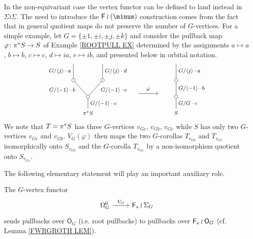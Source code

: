 \documentclass[a4paper,10pt]{article}%
\begin{document}
\begin{remark}\label{NEED_WREATH_REMARK}
In the non-equivariant case the vertex functor can be defined to land instead in $\Sigma \wr \Sigma$.
	The need to introduce the $\Fin \wr (\minus)$ construction comes from the fact that
	in general quotient maps do not preserve the number of $G$-vertices.
	For a simple example, let $G=\{\pm 1, \pm i, \pm j, \pm k\}$ and consider the pullback map 
	$\varphi \colon \pi^{\**} S \to S$ of Example \ref{ROOTPULL EX}
	determined by the assignments
	$a \mapsto a$, $b \mapsto b$, $c \mapsto c$, $d \mapsto i a$, $e \mapsto i b$,	
	and presented below in orbital notation. 
		\[
		\begin{tikzpicture}[grow=up,auto,level distance=2.4em,every node/.style = {font=\footnotesize},dummy/.style={circle,draw,inner sep=0pt,minimum size=1.75mm}]
		\node at (0,0) {$\pi^{\**}S$}
			child{node [dummy] {}
				child{node [dummy] {}
					child{
					edge from parent node [swap] {$G/\langle j \rangle  \cdot d$}}
				edge from parent node[near end,swap] {$G/\langle -1 \rangle  \cdot e$}}
				child{node [dummy] {}
					child{
					edge from parent node {$G/\langle j \rangle  \cdot a$}}
				edge from parent node [near end] {$G/\langle -1 \rangle  \cdot b$}}		
			edge from parent node[swap] {$G/\langle -1 \rangle  \cdot c$}};
		\node at (4.53,0) {$S$}
			child{node [dummy] {}
				child{node [dummy] {}
					child{
					edge from parent node [swap] {$G/\langle j \rangle \cdot a$}}
				edge from parent node [swap] {$G / \langle -1 \rangle \cdot b$}}
			edge from parent node [swap] {$G/G \cdot c$}};
		\draw[->] (2.6,1) -- node [above] {$\varphi$} (3.6,1) ;
		\end{tikzpicture}
		\]
We note that $T = \pi^{\**} S$ has three $G$-vertices $v_{G c}$, $v_{G b}$, $v_{G e}$ while $S$ has only two $G$-vertices $v_{G c}$ and $v_{G b}$. $V_G(\varphi)$ then maps the two $G$-corollas 
$T_{v_{G b}}$ and $T_{v_{G e}}$
isomorphically onto $S_{v_{G b}}$
and the $G$-corolla $T_{v_{Gc}}$ by a non-isomorphism quotient onto $S_{v_{G c}}$.
\end{remark}

The following elementary statement will play an important auxiliary role.


\begin{lemma}\label{VGPULL LEM}
The $G$-vertex functor
\[
\begin{tikzcd}
	\Omega_{G}^0 \ar{r}{V_G} & \Fin_s \wr \Sigma_G
\end{tikzcd}
\]
sends pullbacks over $\mathsf{O}_G$ (i.e. root pullbacks)
to pullbacks over $\mathsf{F}_s \wr \mathsf{O}_G$
(cf. Lemma \ref{FWRGROTH LEM}).
\end{lemma}
\end{document}
